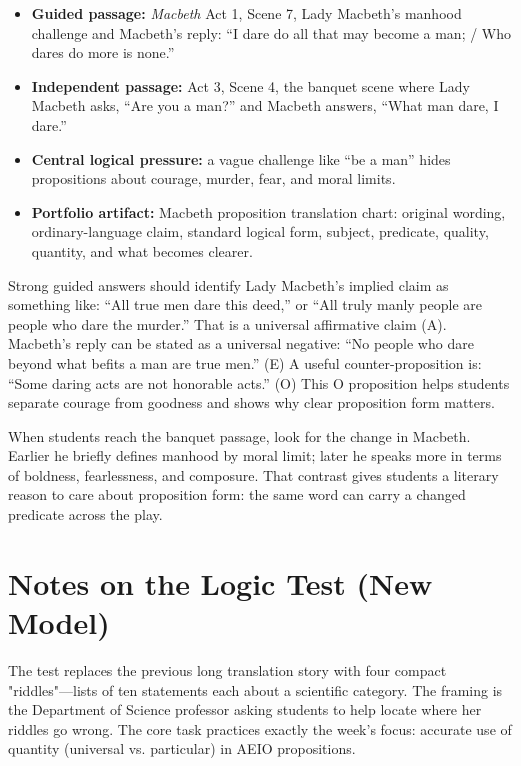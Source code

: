 \documentclass[12pt]{article}
\begin{document}
\begin{itemize}[leftmargin=*]
\item \textbf{Guided passage:} \textit{Macbeth} Act 1, Scene 7, Lady Macbeth's manhood challenge and Macbeth's reply: ``I dare do all that may become a man; / Who dares do more is none.''
\item \textbf{Independent passage:} Act 3, Scene 4, the banquet scene where Lady Macbeth asks, ``Are you a man?'' and Macbeth answers, ``What man dare, I dare.''
\item \textbf{Central logical pressure:} a vague challenge like ``be a man'' hides propositions about courage, murder, fear, and moral limits.
\item \textbf{Portfolio artifact:} Macbeth proposition translation chart: original wording, ordinary-language claim, standard logical form, subject, predicate, quality, quantity, and what becomes clearer.
\end{itemize}

Strong guided answers should identify Lady Macbeth's implied claim as something like: ``All true men dare this deed,'' or ``All truly manly people are people who dare the murder.'' That is a universal affirmative claim (A). Macbeth's reply can be stated as a universal negative: ``No people who dare beyond what befits a man are true men.'' (E) A useful counter-proposition is: ``Some daring acts are not honorable acts.'' (O) This O proposition helps students separate courage from goodness and shows why clear proposition form matters.

When students reach the banquet passage, look for the change in Macbeth. Earlier he briefly defines manhood by moral limit; later he speaks more in terms of boldness, fearlessness, and composure. That contrast gives students a literary reason to care about proposition form: the same word can carry a changed predicate across the play.

\section*{Notes on the Logic Test (New Model)}
The test replaces the previous long translation story with four compact "riddles"—lists of ten statements each about a scientific category. The framing is the Department of Science professor asking students to help locate where her riddles go wrong. The core task practices exactly the week's focus: accurate use of quantity (universal vs. particular) in AEIO propositions.
\end{document}
